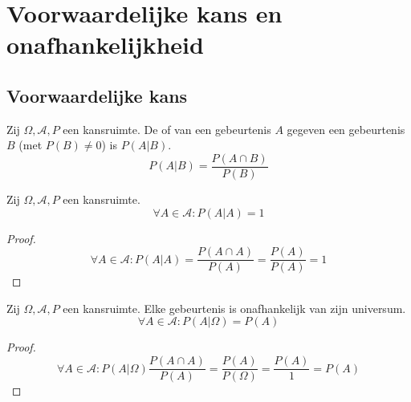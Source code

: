 \documentclass[main.tex]{subfiles}
\begin{document}

\section{Voorwaardelijke kans en onafhankelijkheid}
\label{sec:voorwaardelijke-kans-en-onafhankelijkheid}

\subsection{Voorwaardelijke kans}
\label{sec:voorwaardelijke-kans}

\begin{de}
  \label{de:voorwaardelijke-kans} 
  Zij $\Omega,\mathcal{A},P$ een kansruimte.
  De  of  van een gebeurtenis $A$ gegeven een gebeurtenis $B$ (met $P(B) \neq 0$) is $P(A|B)$.
  \[ P(A|B) = \frac{P(A\cap B)}{P(B)} \]
\end{de}

\begin{ei}
  Zij $\Omega,\mathcal{A},P$ een kansruimte.
  \[ \forall A \in \mathcal{A}: P(A|A) = 1 \]

  \begin{proof}
    \[ \forall A \in \mathcal{A}: P(A|A) = \frac{P(A \cap A)}{P(A)} = \frac{P(A)}{P(A)} = 1 \]
  \end{proof}
\end{ei}

\begin{ei}
  \label{ei:gebeurtenis onafhankelijk van universum}
  Zij $\Omega,\mathcal{A},P$ een kansruimte.
  Elke gebeurtenis is onafhankelijk van zijn universum.
  \[ \forall A \in \mathcal{A}: P(A|\Omega) = P(A) \]

  \begin{proof}
    \[ \forall A \in \mathcal{A}: P(A|\Omega) \frac{P(A \cap A)}{P(A)} = \frac{P(A)}{P(\Omega)} = \frac{P(A)}{1} = P(A)\]
  \end{proof}
\end{ei}
\end{document}
